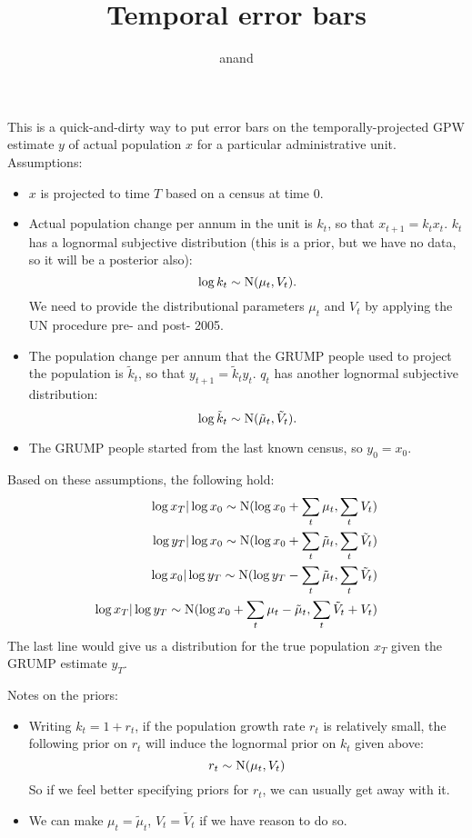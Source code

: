 \documentclass[a4paper]{article}
\begin{document}
\title{Temporal error bars}
\author{anand}
\maketitle

This is a quick-and-dirty way to put error bars on the temporally-projected GPW estimate $y$ of actual population $x$ for a particular administrative unit. Assumptions:
\begin{itemize}
   \item $x$ is projected to time $T$ based on a census at time $0$.
   \item Actual population change per annum in the unit is $k_t$, so that $x_{t+1} = k_t x_t$. $k_t$ has a lognormal subjective distribution (this is a prior, but we have no data, so it will be a posterior also):
   \[
   \log k_t \sim \textup{N}(\mu_t, V_t). 
   \]
   We need to provide the distributional parameters $\mu_t$ and $V_t$ by applying the UN procedure pre- and post- 2005.
   \item The population change per annum that the GRUMP people used to project the population is $\tilde k_t$, so that $y_{t+1} = \tilde k_t y_t$. $q_t$ has another lognormal subjective distribution:
   \[
   \log \tilde k_t \sim \textup{N}(\tilde \mu_t, \tilde V_t). 
   \]
   \item The GRUMP people started from the last known census, so $y_0 = x_0$.
\end{itemize}

Based on these assumptions, the following hold:
\begin{eqnarray}
   \log x_T | \log x_0 \sim \textup{N}(\log x_0 + \sum_t \mu_t, \sum_t V_t)\\   
   \log y_T | \log x_0 \sim \textup{N}(\log x_0 + \sum_t \tilde \mu_t, \sum_t \tilde V_t)\\
   \log x_0 | \log y_T \sim \textup{N}(\log y_T - \sum_t \tilde \mu_t, \sum_t \tilde V_t)\\
   \log x_T | \log y_T \sim \textup{N}(\log x_0 + \sum_t \mu_t - \tilde \mu_t, \sum_t \tilde V_t + V_t) 
\end{eqnarray}
The last line would give us a distribution for the true population $x_T$ given the GRUMP estimate $y_T$.

Notes on the priors:
\begin{itemize}
   \item Writing $k_t = 1 + r_t$, if the population growth rate $r_t$ is relatively small, the following prior on $r_t$ will induce the lognormal prior on $k_t$ given above:
   \[
   r_t \sim \textup{N}(\mu_t, V_t) 
   \]
   So if we feel better specifying priors for $r_t$, we can usually get away with it.
   \item We can make $\mu_t = \tilde \mu_t$, $V_t = \tilde V_t$ if we have reason to do so.
\end{itemize}
\end{document}
